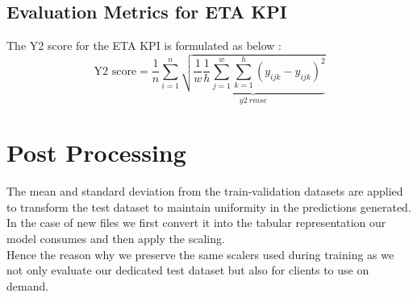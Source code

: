 \documentclass{report} %
\begin{document}
\vspace{0.2cm} %

\subsection{Evaluation Metrics for ETA \ac{KPI}}\label{sec:Evaluation Metrics for 3D KPI}

The Y2 score for the ETA \ac{KPI} is formulated as below :
\begin{equation}
    \text{Y2 score} = \frac{1}{n} \sum_{i=1}^{n} \underbrace{ \sqrt{\frac{1}{w} \frac{1}{h} \sum_{j=1}^{w} \sum_{k=1}^{h} (y_{ijk} - \hat{y}_{ijk})^2}}_{y2\ rmse}
    \label{eq:Y2 Score}
\end{equation}
    


\vspace{0.2cm} %

\section{Post Processing}\label{sec:Post Processing}

The mean and standard deviation from the train-validation datasets are applied to transform the test dataset to maintain uniformity in the predictions generated.
In the case of new files we first convert it into the tabular representation our model consumes and then apply the scaling.\\
Hence the reason why we preserve the same scalers used during training as we not only evaluate our dedicated test dataset but also for clients to use on demand. \\
\end{document}
